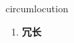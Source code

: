
\begin{frame}
{\huge circumlocution}
\begin{center}
\begin{enumerate}\Large
  \item \textbf{冗长}
\end{enumerate}
\end{center}
\end{frame}

